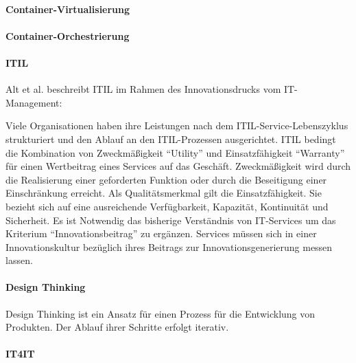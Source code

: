 \paragraph{Container-Virtualisierung}

\paragraph{Container-Orchestrierung}

\paragraph{ITIL}
Alt et al. beschreibt ITIL im Rahmen des Innovationsdrucks vom IT-Management:

Viele Organisationen haben ihre Leistungen nach dem ITIL-Service-Lebenszyklus strukturiert und den Ablauf an den ITIL-Prozessen ausgerichtet. ITIL bedingt die Kombination von Zweckmäßigkeit \enquote{Utility} und Einsatzfähigkeit \enquote{Warranty} für einen Wertbeitrag eines Services auf das Geschäft. Zweckmäßigkeit wird durch die Realisierung einer geforderten Funktion oder durch die Beseitigung einer Einschränkung erreicht. Als Qualitätsmerkmal gilt die Einsatzfähigkeit. Sie bezieht sich auf eine ausreichende Verfügbarkeit, Kapazität, Kontinuität und Sicherheit. Es ist Notwendig das bisherige Verständnis von IT-Services um das Kriterium \enquote{Innovationsbeitrag} zu ergänzen. Services müssen sich in einer Innovationskultur bezüglich ihres Beitrags zur Innovationsgenerierung messen lassen.

\cite{Alt2017}

\paragraph{Design Thinking}
Design Thinking ist ein Ansatz für einen Prozess für die Entwicklung von Produkten. Der Ablauf ihrer Schritte erfolgt iterativ. 

\paragraph{IT4IT}